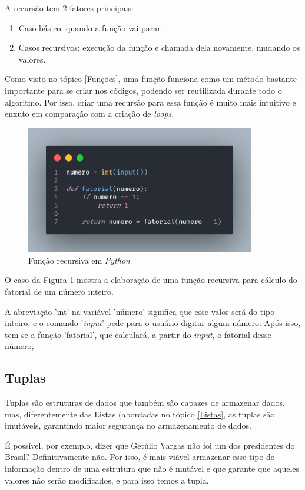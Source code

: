 \documentclass[a4paper, 12pt]{article}
\begin{document}
A recursão tem 2 fatores principais:
\begin{enumerate}
    \item Caso básico: quando a função vai parar
    \item Casos recursivos: execução da função e chamada dela novamente, mudando os valores.
\end{enumerate}

Como visto no tópico \ref{Funções}, uma função funciona como um método bastante importante para se criar nos códigos, podendo ser reutilizada durante todo o algoritmo. Por isso, criar uma recursão para essa função é muito mais intuitivo e enxuto em comparação com a criação de \textit{loops}.

\begin{figure}[ht]
    \centering
    \includegraphics[width = 10cm]{imagens/recursao.png}
    \caption{Função recursiva em \textit{Python}}
    \label{recursao}
\end{figure}

\pagebreak
O caso da Figura \ref{recursao} mostra a elaboração de uma função recursiva para cálculo do fatorial de um número inteiro.

A abreviação 'int' na variável 'número' significa que esse valor será do tipo inteiro, e o comando '\textit{input}' pede para o usuário digitar algum número. Após isso, tem-se a função 'fatorial', que calculará, a partir do \textit{input}, o fatorial desse número,

\subsection{Tuplas}
Tuplas são estruturas de dados que também são capazes de armazenar dados, mas, diferentemente das Listas (abordadas no tópico \ref{Listas}, as tuplas são imutáveis, garantindo maior segurança no armazenamento de dados.

É possível, por exemplo, dizer que Getúlio Vargas não foi um dos presidentes do Brasil? Definitivamente não. Por isso, é mais viável armazenar esse tipo de informação dentro de uma estrutura que não é mutável e que garante que aqueles valores não serão modificados, e para isso temos a tupla.
\end{document}
